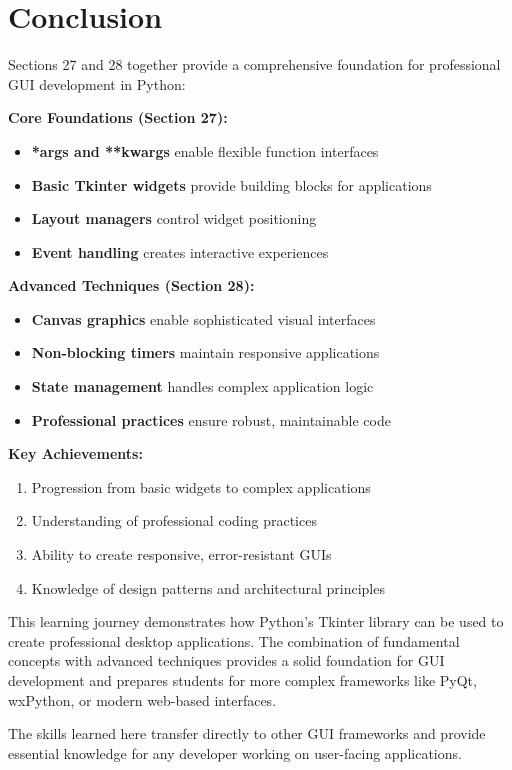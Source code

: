\documentclass[12pt,a4paper]{article}
\begin{document}
\section{Conclusion}

Sections 27 and 28 together provide a comprehensive foundation for professional GUI development in Python:

\textbf{Core Foundations (Section 27):}
\begin{itemize}
    \item \textbf{*args and **kwargs} enable flexible function interfaces
    \item \textbf{Basic Tkinter widgets} provide building blocks for applications
    \item \textbf{Layout managers} control widget positioning
    \item \textbf{Event handling} creates interactive experiences
\end{itemize}

\textbf{Advanced Techniques (Section 28):}
\begin{itemize}
    \item \textbf{Canvas graphics} enable sophisticated visual interfaces
    \item \textbf{Non-blocking timers} maintain responsive applications
    \item \textbf{State management} handles complex application logic
    \item \textbf{Professional practices} ensure robust, maintainable code
\end{itemize}

\textbf{Key Achievements:}
\begin{enumerate}
    \item Progression from basic widgets to complex applications
    \item Understanding of professional coding practices
    \item Ability to create responsive, error-resistant GUIs
    \item Knowledge of design patterns and architectural principles
\end{enumerate}

This learning journey demonstrates how Python's Tkinter library can be used to create professional desktop applications. The combination of fundamental concepts with advanced techniques provides a solid foundation for GUI development and prepares students for more complex frameworks like PyQt, wxPython, or modern web-based interfaces.

The skills learned here transfer directly to other GUI frameworks and provide essential knowledge for any developer working on user-facing applications.
\end{document}
